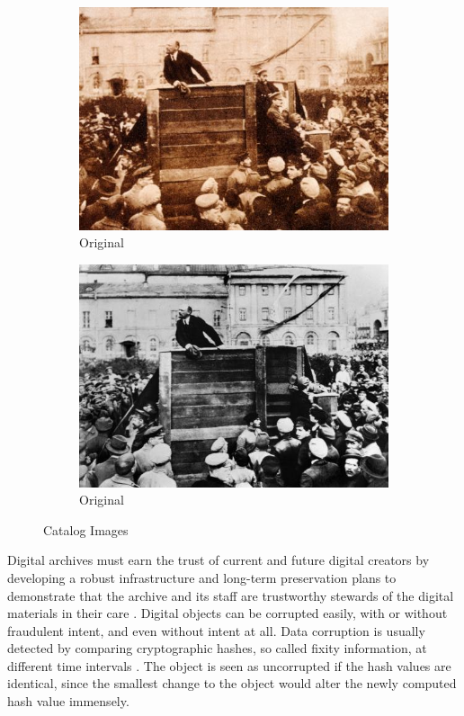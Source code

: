 \begin{figure}[h]%
    \centering
    \begin{subfigure}{6cm}
    \includegraphics[width=\linewidth]{graphics/trotzki1.jpg}
    \caption{Original}\label{fig:f1}
    \end{subfigure}
    \qquad
    \begin{subfigure}{6cm}
    \includegraphics[width=\linewidth]{graphics/trotzki2.jpg}
    \caption{Original}
    \end{subfigure}
    \caption{Catalog Images}\label{fig:f2}
\end{figure}

Digital archives must earn the trust of current and future digital creators by developing a robust infrastructure and long-term preservation plans to demonstrate that the archive and its staff are trustworthy stewards of the digital materials in their care \cite[37]{kirschenbaum2010digital}. Digital objects can be corrupted easily, with or without fraudulent intent, and even without intent at all. Data corruption is usually detected by comparing cryptographic hashes, so called fixity information, at different time intervals \cite[1]{de2014checking}. The object is seen as uncorrupted if the hash values are identical, since the smallest change to the object would alter the newly computed hash value immensely. 


